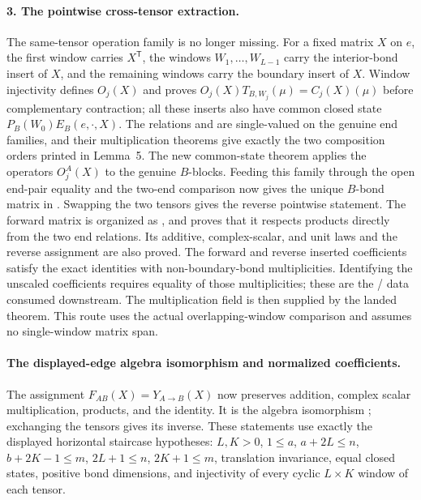 \documentclass{article}
\begin{document}
\paragraph{3. The pointwise cross-tensor extraction.}
The same-tensor operation family is no longer missing.  For a fixed matrix
$X$ on $e$, the first window carries $X^{\mathsf T}$, the windows
$W_1,\ldots,W_{L-1}$ carry the interior-bond insert of $X$, and the remaining
windows carry the boundary insert of $X$.  Window injectivity defines
$O_j(X)$ and proves $O_j(X)T_{B,W_j}(\mu)=C_j(X)(\mu)$ before complementary
contraction; all these inserts also have common closed state
$P_B(W_0)E_B(e,\cdot,X)$.  The relations
 and
 are single-valued on the
genuine end families, and their multiplication theorems give exactly the two
composition orders printed in Lemma~5.  The new common-state theorem applies
the operators $O_j^A(X)$ to the genuine $B$-blocks.  Feeding this family
through the open end-pair equality and the two-end comparison now gives the
unique $B$-bond matrix in
.
Swapping the two tensors gives the reverse pointwise statement.  The forward
matrix is organized as
, and
 proves that it
respects products directly from the two end relations. Its additive,
complex-scalar, and unit laws and the reverse assignment are also proved.
The forward and reverse inserted coefficients satisfy the exact identities
with non-boundary-bond multiplicities. Identifying the unscaled coefficients
requires equality of those multiplicities; these are the
/ data consumed downstream.  The multiplication field  is then supplied by the
landed theorem.  This route uses the actual overlapping-window
comparison and assumes no single-window matrix span.


\paragraph{The displayed-edge algebra isomorphism and normalized coefficients.}
The assignment $F_{AB}(X)=Y_{A\to B}(X)$ now preserves addition,
complex scalar multiplication, products, and the identity. It is the
algebra isomorphism ;
exchanging the tensors gives its inverse. These statements use exactly
the displayed horizontal staircase hypotheses: $L,K>0$,
$1\leq a$, $a+2L\leq n$, $b+2K-1\leq m$,
$2L+1\leq n$, $2K+1\leq m$, translation invariance, equal closed
states, positive bond dimensions, and injectivity of every cyclic
$L\times K$ window of each tensor.
\end{document}
